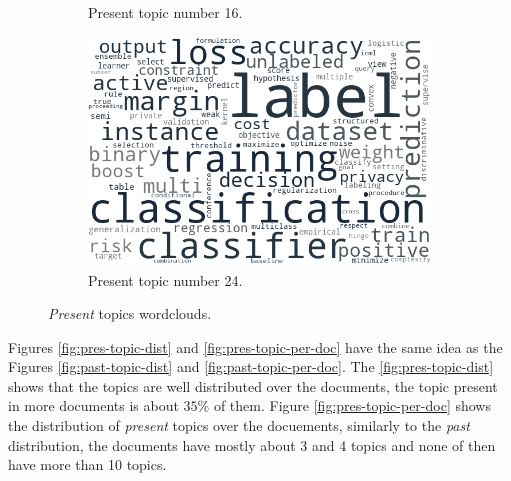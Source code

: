 \begin{figure}[h!]
\begin{subfigure}{0.49\textwidth}
		\caption{Present topic number 16.}
	\end{subfigure}%
	\hfill
	\begin{subfigure}{0.49\textwidth}
		\includegraphics[width=\linewidth]{01.Chapters/05.Results/pres_24}
		\caption{Present topic number 24.}
	\end{subfigure}%
	\caption{\textit{Present} topics wordclouds.}
	\label{fig:pres-wordcloud}
\end{figure}

Figures \ref{fig:pres-topic-dist} and \ref{fig:pres-topic-per-doc} have the same idea as the Figures \ref{fig:past-topic-dist} and \ref{fig:past-topic-per-doc}. The \ref{fig:pres-topic-dist} shows that the topics are well distributed over the documents, the topic present in more documents is about $35\%$ of them. Figure \ref{fig:pres-topic-per-doc} shows the distribution of \textit{present} topics over the docuements, similarly to the \textit{past} distribution, the documents have mostly about 3 and 4 topics and none of then have more than 10 topics.

